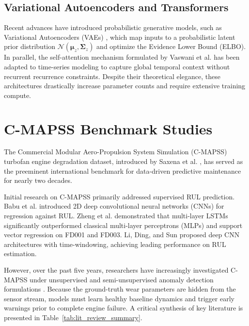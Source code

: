 \documentclass[12pt,a4paper,oneside]{report}
\begin{document}
\subsection{Variational Autoencoders and Transformers}
Recent advances have introduced probabilistic generative models, such as Variational Autoencoders (VAEs) \cite{kingma2014auto}, which map inputs to a probabilistic latent prior distribution $\mathcal{N}(\boldsymbol{\mu}_z, \boldsymbol{\Sigma}_z)$ and optimize the Evidence Lower Bound (ELBO). In parallel, the self-attention mechanism formulated by Vaswani et al. \cite{vaswani2017attention} has been adapted to time-series modeling to capture global temporal context without recurrent recurrence constraints. Despite their theoretical elegance, these architectures drastically increase parameter counts and require extensive training compute.

\section{C-MAPSS Benchmark Studies}
The Commercial Modular Aero-Propulsion System Simulation (C-MAPSS) turbofan engine degradation dataset, introduced by Saxena et al. \cite{saxena2008damage}, has served as the preeminent international benchmark for data-driven predictive maintenance for nearly two decades. 

Initial research on C-MAPSS primarily addressed supervised RUL prediction. Babu et al. \cite{babu2016deep} introduced 2D deep convolutional neural networks (CNNs) for regression against RUL. Zheng et al. \cite{zheng2017long} demonstrated that multi-layer LSTMs significantly outperformed classical multi-layer perceptrons (MLPs) and support vector regression on FD001 and FD003. Li, Ding, and Sun \cite{li2018remaining} proposed deep CNN architectures with time-windowing, achieving leading performance on RUL estimation.

However, over the past five years, researchers have increasingly investigated C-MAPSS under unsupervised and semi-unsupervised anomaly detection formulations \cite{zhao2019deep}. Because the ground-truth wear parameters are hidden from the sensor stream, models must learn healthy baseline dynamics and trigger early warnings prior to complete engine failure. A critical synthesis of key literature is presented in Table~\ref{tab:lit_review_summary}.
\end{document}

